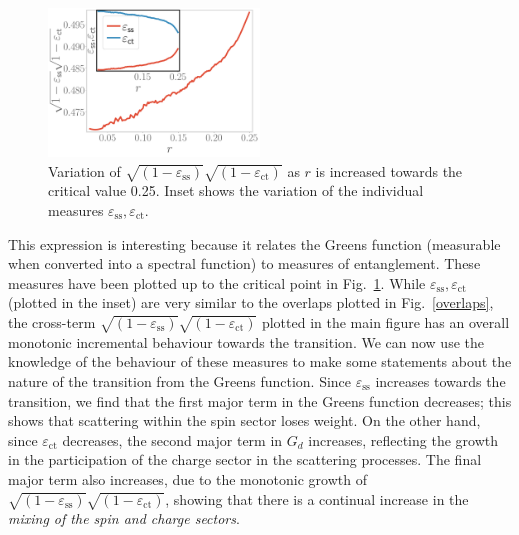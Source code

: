 \documentclass[reprint,superscriptaddress,floatfix]{revtex4-2}
\begin{document}
\begin{figure}[htpb]
	\centering
	\includegraphics[width=0.5\textwidth]{entanglement.pdf}
	\caption{Variation of \(\sqrt{\left(1 - \varepsilon_\text{ss} \right)}\sqrt{\left(1 - \varepsilon_\text{ct} \right)}\) as \(r\) is increased towards the critical value 0.25. Inset shows the variation of the individual measures \(\varepsilon_\text{ss},\varepsilon_\text{ct}\).}
	\label{entng}
\end{figure}

This expression is interesting because it relates the Greens function (measurable when converted into a spectral function) to measures of entanglement.
These measures have been plotted up to the critical point in Fig.~\ref{entng}.
While \(\varepsilon_\text{ss},\varepsilon_\text{ct}\) (plotted in the inset) are very similar to the overlaps plotted in Fig.~\ref{overlaps}, the cross-term \(\sqrt{\left(1 - \varepsilon_\text{ss} \right)}\sqrt{\left(1 - \varepsilon_\text{ct} \right)}\) plotted in the main figure has an overall monotonic incremental behaviour towards the transition.
We can now use the knowledge of the behaviour of these measures to make some statements about the nature of the transition from the Greens function.
Since \(\varepsilon_\text{ss}\) increases towards the transition, we find that the first major term in the Greens function decreases; this shows that scattering within the spin sector loses weight.
On the other hand, since \(\varepsilon_\text{ct}\) decreases, the second major term in \(G_d\) increases, reflecting the growth in the participation of the charge sector in the scattering processes.
The final major term also increases, due to the monotonic growth of \(\sqrt{\left(1 - \varepsilon_\text{ss} \right)}\sqrt{\left(1 - \varepsilon_\text{ct} \right)}\), showing that there is a continual increase in the {\it mixing of the spin and charge sectors}.
\end{document}
